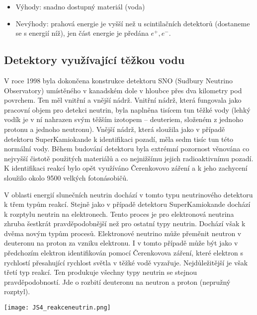 \documentclass[../../main.tex]{subfiles}
\begin{document}
\begin{itemize}
	\item Výhody: snadno dostupný materiál (voda)
	\item Nevýhody: prahová energie je vyšší než u scintilačních detektorů (dostaneme se s energií níž), jen část energie je předána $e^+ , e^-$.
\end{itemize}	 

\subsection{Detektory využívající těžkou vodu}

V roce 1998 byla dokončena konstrukce detektoru SNO (Sudbury Neutrino Observatory) umístěného v kanadském dole v hloubce přes dva kilometry pod povrchem. Ten měl vnitřní a vnější nádrž. Vnitřní nádrž, která fungovala jako pracovní objem pro detekci neutrin, byla naplněna tisícem tun těžké vody (lehký vodík je v ní nahrazen svým těžším izotopem – deuteriem, složeném z jednoho protonu a jednoho neutronu). Vnější nádrž, která sloužila jako v případě detektoru SuperKamiokande k identifikaci pozadí, měla sedm tisíc tun této normální vody. Během budování detektoru byla extrémní pozornost věnována co nejvyšší čistotě použitých materiálů a co nejnižšímu jejich radioaktivnímu pozadí. K identifikaci reakcí bylo opět využíváno Čerenkovovo záření a k jeho zachycení sloužilo okolo 9500 velkých fotonásobičů.

V oblasti energií slunečních neutrin dochází v tomto typu neutrinového detektoru k třem typům reakcí. Stejně jako v případě detektoru SuperKamiokande dochází k rozptylu neutrin na elektronech. Tento proces je pro elektronová neutrina zhruba šestkrát pravděpodobnější než pro ostatní typy neutrin. Dochází však k dvěma novým typům procesů. Elektronové neutrino může přeměnit neutron v deuteronu na proton za vzniku elektronu. I v tomto případě může být jako v předchozím elektron identifikován pomocí Čerenkovova záření, které elektron s rychlostí přesahující rychlost světla v těžké vodě vyzařuje. Nejdůležitější je však třetí typ reakcí. Ten produkuje všechny typy neutrin se stejnou pravděpodobností. Jde o rozbití deuteronu na neutron a proton (nepružný rozptyl).

\begin{center}
	\texttt{[image: JS4\_reakceneutrin.png]}
\end{center}
\end{document}
